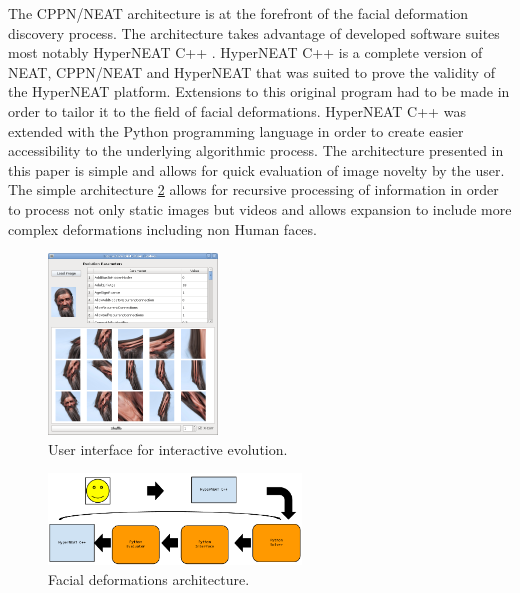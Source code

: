 The CPPN/NEAT architecture is at the forefront of the facial deformation discovery process. The architecture takes 
advantage of developed software suites most notably HyperNEAT C++ \cite{jasongauci}. HyperNEAT C++ is a complete
version of NEAT, CPPN/NEAT and HyperNEAT that was suited to prove the validity of the HyperNEAT platform. 
Extensions to this original program had to be made in order to tailor it to the field of facial deformations. 
HyperNEAT C++ was extended with the Python programming language in order to create easier accessibility to the
underlying algorithmic process. The architecture presented in this paper is simple and allows for quick 
evaluation of image novelty by the user. The simple architecture \ref{fig:paper:architecture} allows for recursive 
processing of information in order to process not only static images but videos and allows expansion to
include more complex deformations including non Human faces.

\begin{figure}
    \centering
    \label{fig:paper:interface}
    \includegraphics[width=0.4\textwidth]{../../rec/paper/interface.png}
    \caption{User interface for interactive evolution.}
\end{figure}

\begin{figure}
    \centering
    \label{fig:paper:architecture}
    \includegraphics[width=0.6\textwidth]{../../rec/paper/architecture.png}
    \caption{Facial deformations architecture.}
\end{figure}

